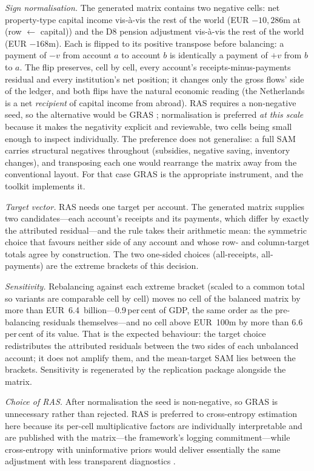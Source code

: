 \emph{Sign normalisation.} The generated matrix contains two negative
cells: net property-type capital income vis-\`a-vis the rest of the world
(EUR $-10{,}286$m at (row $\leftarrow$ capital)) and the D8 pension
adjustment vis-\`a-vis the rest of the world (EUR $-168$m). Each is
flipped to its positive transpose before balancing: a payment of $-v$
from account $a$ to account $b$ is identically a payment of $+v$ from
$b$ to $a$. The flip preserves, cell by cell, every account's
receipts-minus-payments residual and every institution's net position;
it changes only the gross flows' side of the ledger, and both flips have
the natural economic reading (the Netherlands is a net \emph{recipient}
of capital income from abroad). RAS requires a non-negative seed, so the
alternative would be GRAS \citep{junius2003}; normalisation is preferred
\emph{at this scale} because it makes the negativity explicit and
reviewable, two cells being small enough to inspect individually. The
preference does not generalise: a full SAM carries structural negatives
throughout (subsidies, negative saving, inventory changes), and
transposing each one would rearrange the matrix away from the
conventional layout. For that case GRAS is the appropriate instrument,
and the toolkit implements it.

\emph{Target vector.} RAS needs one target per account. The generated
matrix supplies two candidates---each account's receipts and its
payments, which differ by exactly the attributed residual---and the rule
takes their arithmetic mean: the symmetric choice that favours neither
side of any account and whose row- and column-target totals agree by
construction. The two one-sided choices (all-receipts, all-payments) are
the extreme brackets of this decision.

\emph{Sensitivity.} Rebalancing against each extreme bracket (scaled to
a common total so variants are comparable cell by cell) moves no cell of
the balanced matrix by more than EUR~6.4~billion---0.9\,per\,cent of
GDP, the same order as the pre-balancing residuals themselves---and no
cell above EUR~100m by more than 6.6\,per\,cent of its value. That is
the expected behaviour: the target choice redistributes the attributed
residuals between the two sides of each unbalanced account; it does not
amplify them, and the mean-target SAM lies between the brackets.
Sensitivity is regenerated by the replication package alongside the
matrix.

\emph{Choice of RAS.} After normalisation the seed is non-negative, so
GRAS is unnecessary rather than rejected. RAS is preferred to
cross-entropy estimation here because its per-cell multiplicative
factors are individually interpretable and are published with the
matrix---the framework's logging commitment---while cross-entropy with
uninformative priors would deliver essentially the same adjustment with
less transparent diagnostics \citep{robinson2001}.

